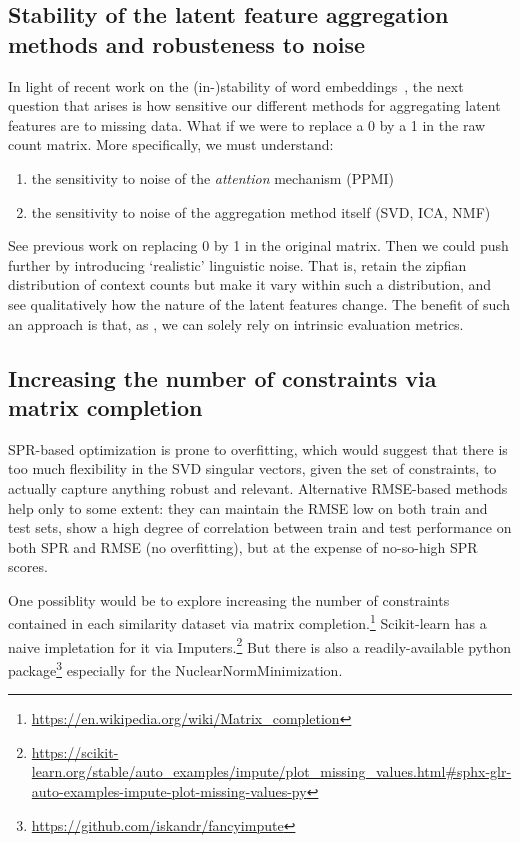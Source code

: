 \documentclass[utf8]{article}
\begin{document}
\subsection{Stability of the latent feature aggregation methods and robusteness to noise}
In light of recent work on the (in-)stability of word embeddings~\citep{antoniakandmimno2018,pierrejeanandtanguy2018}, the next question that arises is how sensitive our different methods for aggregating latent features are to missing data.
What if we were to replace a 0 by a 1 in the raw count matrix. More specifically, we must understand:
\begin{enumerate}
  \item the sensitivity to noise of the \emph{attention} mechanism (PPMI)
  \item the sensitivity to noise of the aggregation method itself (SVD, ICA, NMF)
\end{enumerate}
See previous work on replacing 0 by 1 in the original matrix. Then we could push further by introducing `realistic' linguistic noise. That is, retain the zipfian distribution of context counts but make it vary within such a distribution, and see qualitatively how the nature of the latent features change. The benefit of such an approach is that, as \cite{antoniakandmimno2018,pierrejeanandtanguy2018}, we can solely rely on intrinsic evaluation metrics.

\subsection{Increasing the number of constraints via matrix completion}
SPR-based optimization is prone to overfitting, which would suggest that there is too much flexibility in the SVD singular vectors, given the set of constraints, to actually capture anything robust and relevant.
Alternative RMSE-based methods help only to some extent: they can maintain the RMSE low on both train and test sets, show a high degree of correlation between train and test performance on both SPR and RMSE (no overfitting), but at the expense of no-so-high SPR scores.

One possiblity would be to explore increasing the number of constraints contained in each similarity dataset via matrix completion.\footnote{\url{https://en.wikipedia.org/wiki/Matrix_completion}}
Scikit-learn has a naive impletation for it via Imputers.\footnote{\url{https://scikit-learn.org/stable/auto_examples/impute/plot_missing_values.html#sphx-glr-auto-examples-impute-plot-missing-values-py}}
But there is also a readily-available python package\footnote{\url{https://github.com/iskandr/fancyimpute}} especially for the NuclearNormMinimization.
\end{document}

